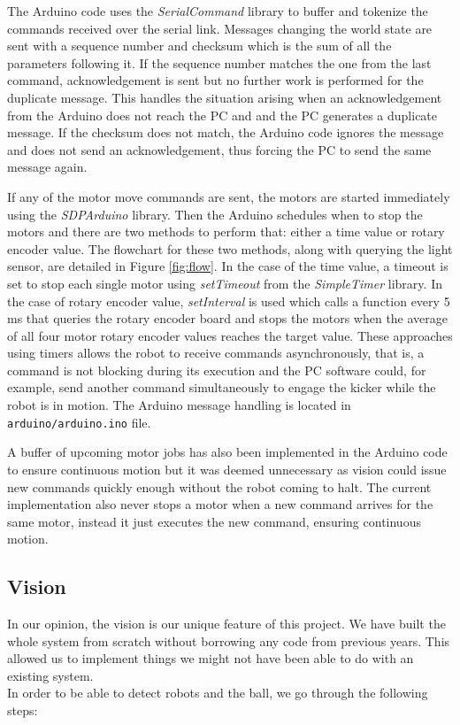\documentclass[a4paper,12pt]{article}
\begin{document}
The Arduino code uses the \textit{SerialCommand} library to buffer and tokenize the commands received over the serial link. Messages changing the world state are sent with a sequence number and checksum which is the sum of all the parameters following it. If the sequence number matches the one from the last command, acknowledgement is sent but no further work is performed for the duplicate message. This handles the situation arising when an acknowledgement from the Arduino does not reach the PC and and the PC generates a duplicate message. If the checksum does not match, the Arduino code ignores the message and does not send an acknowledgement, thus forcing the PC to send the same message again.

If any of the motor move commands are sent, the motors are started immediately using the \textit{SDPArduino} library. Then the Arduino schedules when to stop the motors and there are two methods to perform that: either a time value or rotary encoder value. The flowchart for these two methods, along with querying the light sensor, are detailed in Figure \ref{fig:flow}.
In the case of the time value, a timeout is set to stop each single motor using
\textit{setTimeout} from the \textit{SimpleTimer} library.
In the case of rotary encoder value, \textit{setInterval} is used which calls
a function every 5 ms that queries the rotary encoder board and stops the motors
when the average of all four motor rotary encoder values reaches the target value. These approaches using timers
allows the robot to receive commands asynchronously, that is, a command is not
blocking during its execution and the PC software could, for example, send another command simultaneously to engage the kicker while the robot is in motion.
The Arduino message handling is located in \texttt{arduino/arduino.ino} file.

A buffer of upcoming motor jobs has also been implemented in the Arduino code to ensure continuous motion but it was deemed unnecessary as vision could issue new commands quickly enough without the robot coming to halt. The current implementation also never stops a motor when a new command arrives for the same motor, instead it just executes the new command, ensuring continuous motion.

\subsection{Vision}

In our opinion, the vision is our unique feature of this project. We have built the whole system from scratch without borrowing any code from previous years. This allowed us to implement things we might not have been able to do with an existing system. 
\\In order to be able to detect robots and the ball, we go through the following steps:
\end{document}
